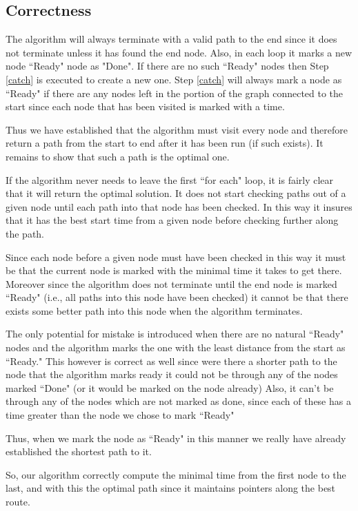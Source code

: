 \documentclass{article}
\begin{document}
\subsection{Correctness}
The algorithm will always terminate with a valid path to the end since it does not terminate unless it has found the end node. Also, in each loop it marks a new node ``Ready" node as "Done". If there are no such ``Ready" nodes then Step \ref{catch} is executed to create a new one. Step \ref{catch} will always mark a node as ``Ready" if there are any nodes left in the portion of the graph connected to the start since each node that has been visited is marked with a time.

Thus we have established that the algorithm must visit every node and therefore return a path from the start to end after it has been run (if such exists). It remains to show that such a path is the optimal one.

If the algorithm never needs to leave the first ``for each" loop, it is fairly clear that it will return the optimal solution. It does not start checking paths out of a given node until each path into that node has been checked. In this way it insures that it has the best start time from a given node before checking further along the path.

Since each node before a given node must have been checked in this way it must be that the current node is marked with the minimal time it takes to get there. Moreover since the algorithm does not terminate until the end node is marked ``Ready" (i.e.,  all paths into this node have been checked) it cannot be that there exists some better path into this node when the algorithm terminates.

The only potential for mistake is introduced when there are no natural ``Ready" nodes and the algorithm marks the one with the least distance from the start as ``Ready." This however is correct as well since were there a shorter path to the node that the algorithm marks ready it could not be through any of the nodes marked ``Done" (or it would be marked on the node already) Also, it can't be through any of the nodes which are not marked as done, since each of these has a time greater than the node we chose to mark ``Ready"

Thus, when we mark the node as ``Ready" in this manner we really have already established the shortest path to it.

So, our algorithm correctly compute the minimal time from the first node to the last, and with this the optimal path since it maintains pointers along the best route. 
\end{document}
